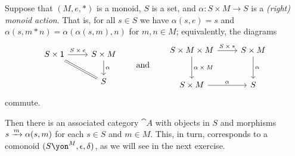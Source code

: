 \documentclass[Book-Poly]{subfiles}
\begin{document}
\begin{example}\label{ex.monoid_action}
Suppose that $(M,e,*)$ is a monoid, $S$ is a set, and $\alpha\colon S\times M\to S$ is a \emph{(right) monoid action}.
That is, for all $s\in S$ we have $\alpha(s,e)=s$ and $\alpha(s,m*n)=\alpha(\alpha(s,m),n)$ for $m,n\in M$; equivalently, the diagrams
\[
\begin{tikzcd}
	S\times\1\ar[rd,equals]\ar[r,"S\:\times\:e"] & S\times M\ar[d,"\alpha"]\\
	& S
\end{tikzcd}
\qqand
\begin{tikzcd}[row sep=large]
    S\times M\times M\ar[r,"S\:\times\:*"]\ar[d,"\alpha\:\times\:M"] & S\times M\ar[d,"\alpha"]\\
    S\times M\ar[r,"\alpha"] & S
\end{tikzcd}
\]
commute.

Then there is an associated category $\cat{A}$ with objects in $S$ and morphisms $s\xrightarrow{m}\alpha(s,m)$ for each $s\in S$ and $m\in M$.
This, in turn, corresponds to a comonoid $(S\yon^M,\epsilon,\delta)$, as we will see in the next exercise.
\end{example}
\end{document}
